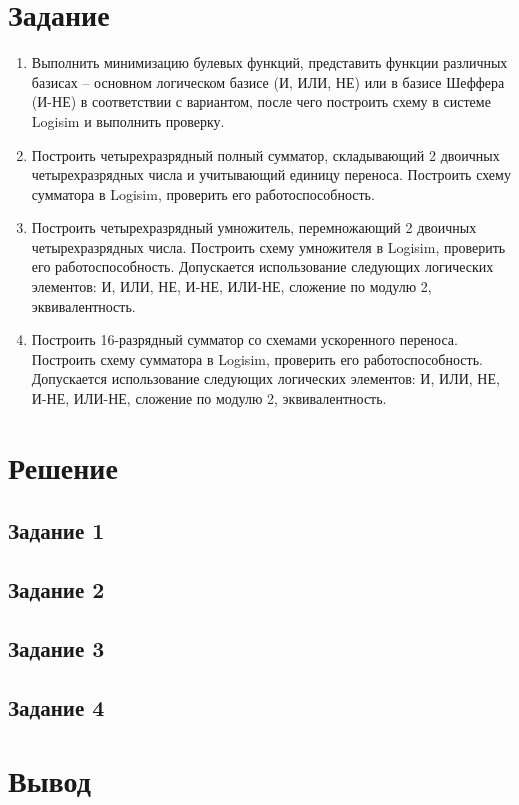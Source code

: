 \documentclass[a4paper,14pt]{extarticle}
\begin{document}
	\section*{Задание}
	\begin{enumerate}
		\item Выполнить минимизацию булевых функций, представить функции различных базисах – основном логическом базисе (И, ИЛИ, НЕ) или в базисе Шеффера (И-НЕ) в соответствии с вариантом, после чего построить схему в системе Logisim и выполнить проверку.
		
		\item Построить четырехразрядный полный сумматор, складывающий 2 двоичных четырехразрядных числа и учитывающий единицу переноса. Построить схему сумматора в Logisim, проверить его работоспособность.
		
		\item Построить четырехразрядный умножитель, перемножающий 2 двоичных четырехразрядных числа. Построить схему умножителя в Logisim, проверить его работоспособность.  Допускается использование следующих логических элементов: И, ИЛИ, НЕ, И-НЕ, ИЛИ-НЕ,  сложение по модулю 2, эквивалентность.
		
		\item Построить 16-разрядный сумматор со схемами ускоренного переноса.  Построить схему сумматора в Logisim, проверить его работоспособность.  Допускается использование следующих логических элементов: И, ИЛИ, НЕ, И-НЕ, ИЛИ-НЕ,  сложение по модулю 2, эквивалентность.
	\end{enumerate}
	
	\newpage
	\section*{Решение}
	\subsection*{Задание 1}
	
	\subsection*{Задание 2}
	
	\subsection*{Задание 3}
	
	\subsection*{Задание 4}
	
	\section*{Вывод}
	
\end{document}
